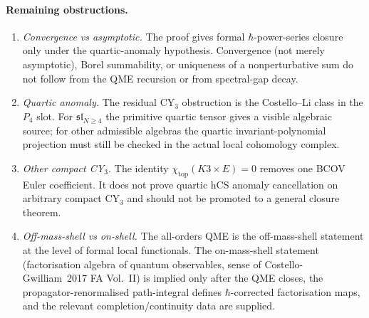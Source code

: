 \documentclass[11pt]{amsart}
\theoremstyle{definition}
\theoremstyle{remark}
\providecommand{\fsl}{\mathfrak{sl}}
\begin{document}
\paragraph{Remaining obstructions.}
\begin{enumerate}[label=(\alph*)]
\item \emph{Convergence vs asymptotic.} The proof gives formal
$\hbar$-power-series closure only under the quartic-anomaly hypothesis.
Convergence (not merely asymptotic), Borel summability, or uniqueness
of a nonperturbative sum do not follow from the QME recursion or from
spectral-gap decay.
\item \emph{Quartic anomaly.} The residual CY$_3$ obstruction is the
Costello--Li class in the $P_4$ slot. For $\fsl_{N\ge4}$ the primitive
quartic tensor gives a visible algebraic source; for other admissible
algebras the quartic invariant-polynomial projection must still be
checked in the actual local cohomology complex.
\item \emph{Other compact CY$_3$.} The identity
$\chi_{\mathrm{top}}(K3 \times E) = 0$ removes one BCOV Euler
coefficient. It does not prove quartic hCS anomaly cancellation on
arbitrary compact CY$_3$ and should not be promoted to a general
closure theorem.
\item \emph{Off-mass-shell vs on-shell.} The all-orders QME is the
off-mass-shell statement at the level of formal local functionals.
The on-mass-shell statement (factorisation algebra of quantum
observables, sense of Costello-Gwilliam~2017 FA Vol.~II) is implied
only after the QME closes, the propagator-renormalised path-integral
defines $\hbar$-corrected factorisation maps, and the relevant
completion/continuity data are supplied.
\end{enumerate}

\end{document}
